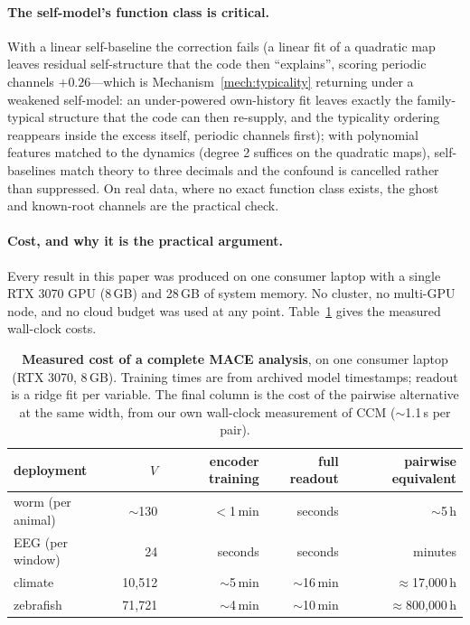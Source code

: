 \documentclass[11pt]{article}
\begin{document}
\paragraph{The self-model's function class is critical.} With a linear
self-baseline the correction fails (a linear fit of a quadratic map leaves
residual self-structure that the code then ``explains'', scoring periodic
channels $+0.26$---which is Mechanism~\ref{mech:typicality} returning under a weakened self-model: an under-powered own-history fit leaves exactly the family-typical structure that the code can then re-supply, and the typicality ordering reappears inside the excess itself, periodic channels first); with polynomial features matched to the dynamics
(degree 2 suffices on the quadratic maps), self-baselines match theory to
three decimals and the confound is cancelled rather than suppressed. On
real data, where no exact function class exists, the ghost and known-root
channels are the practical check.

\paragraph{Cost, and why it is the practical argument.} Every result in
this paper was produced on one consumer laptop with a single RTX 3070
GPU (8\,GB) and 28\,GB of system memory. No cluster, no multi-GPU node,
and no cloud budget was used at any point. Table~\ref{tab:cost} gives the
measured wall-clock costs.

\begin{table}[t]
\centering
\caption{\textbf{Measured cost of a complete MACE analysis}, on one
consumer laptop (RTX 3070, 8\,GB). Training times are from archived model
timestamps; readout is a ridge fit per variable. The final column is the
cost of the pairwise alternative at the same width, from our own
wall-clock measurement of CCM ($\sim$1.1\,s per pair).}
\label{tab:cost}
\small
\begin{tabular}{lrrrr}
\toprule
deployment & $V$ & encoder training & full readout & pairwise equivalent\\
\midrule
worm (per animal)   & $\sim$130 & $<$1\,min & seconds & $\sim$5\,h\\
EEG (per window)    & 24 & seconds & seconds & minutes\\
climate             & 10{,}512 & $\sim$5\,min & $\sim$16\,min & $\approx$17{,}000\,h\\
zebrafish           & 71{,}721 & $\sim$4\,min & $\sim$10\,min & $\approx$800{,}000\,h\\
\bottomrule
\end{tabular}
\end{table}
\end{document}
